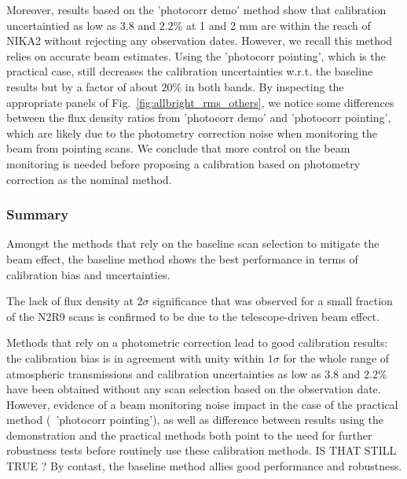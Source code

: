 Moreover, results based on the 'photocorr demo' method show that calibration
uncertaintied as low as $3.8$ and $2.2\%$
at 1 and 2 mm are within the reach of NIKA2 without rejecting any
observation dates. However, we recall this method relies on 
accurate beam estimates. Using the 'photocorr pointing', which is the
practical case, still decreases the calibration uncertainties
w.r.t. the baseline results but by a factor of about $20\%$ in both
bands. By inspecting the appropriate panels of
Fig.~\ref{fig:allbright_rms_others}, we notice some differences between
the flux density ratios from 'photocorr demo' and 'photocorr
pointing', which are likely due to the photometry correction noise
when monitoring the beam from pointing scans. We conclude that more
control on the beam monitoring is needed before proposing a calibration
based on photometry correction as the nominal method.


\subsubsection{Summary}

Amongst the methods that rely on the baseline scan selection to
mitigate the beam effect, the baseline method shows the best
performance in terms of calibration bias and uncertainties.

The lack of flux density at $2\sigma$ significance that was observed
for a small fraction of the N2R9 scans is confirmed to be due to the
telescope-driven beam effect.

Methods that rely on a photometric correction lead to good calibration
results: the calibration bias is in agreement with unity within
$1\sigma$ for the whole range of atmospheric transmissions and
calibration uncertainties as low as $3.8$ and $2.2\%$ have been obtained
without any scan selection based on the observation date. {\color{magenta}However,
evidence of a beam monitoring noise impact in the case of the
practical method (\aka\ 'photocorr pointing'), as well as difference
between results using the demonstration and the practical methods both
point to the need for further robustness tests before routinely use
these calibration methods. IS THAT STILL TRUE ?}
By contast, the baseline method allies good
performance and robustness.    









